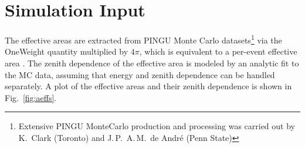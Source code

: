 \section{Simulation Input}
\label{sec:sim_input}


The effective areas are
extracted from PINGU Monte Carlo datasets\footnote{Extensive PINGU MonteCarlo
production and processing was carried out by K.\ Clark (Toronto) and J.\,P.\
A.\,M.\ de Andr\'{e} (Penn State)} via the OneWeight quantity multiplied by
$4\pi$, which is equivalent to a per-event effective area \cite{OneWeight}. The
zenith dependence of the effective area is modeled by an analytic fit to the MC
data, assuming that energy and zenith dependence can be handled separately. A
plot of the effective areas and their zenith dependence is shown in
Fig.~\ref{fig:aeffs}.

